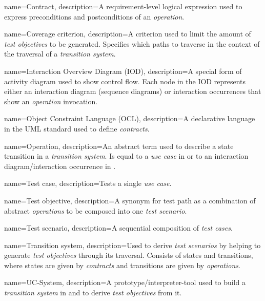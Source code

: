 {
	name={Contract},
	description={A requirement-level logical expression used to express preconditions and postconditions of an \textit{operation}.}
}

{
	name={Coverage criterion},
	description={A criterion used to limit the amount of \textit{test objectives} to be generated. Specifies which paths to traverse in the context of the traversal of a \textit{transition system}.}
}

{
	name={Interaction Overview Diagram (IOD)},
	description={A special form of activity diagram used to show control flow. Each node in the IOD represents either an interaction diagram (sequence diagrams) or interaction occurrences that show an \textit{operation} invocation.}
}

{
	name={Object Constraint Language (OCL)},
	description={A declarative language in the UML standard used to define \textit{contracts}.}
}

{
	name={Operation},
	description={An abstract term used to describe a state transition in a \textit{transition system}. Is equal to a \textit{use case} in \cite{ClementineNebut2006} or to an interaction diagram/interaction occurrence in \cite{NajlaRaza2007}.}
}

{
	name={Test case},
	description={Tests a single \textit{use case}.}
}

{
	name={Test objective},
	description={A synonym for test path as a combination of abstract \textit{operations} to be composed into one \textit{test scenario}.}
}

{
	name={Test scenario},
	description={A sequential composition of \textit{test cases}.}
}

{
	name={Transition system},
	description={Used to derive \textit{test scenarios} by helping to generate \textit{test objectives} through its traversal. Consists of states and transitions, where states are given by \textit{contracts} and transitions are given by \textit{operations}.}
}

{
	name={UC-System},
	description={A prototype/interpreter-tool used to build a \textit{transition system} in \cite{ClementineNebut2006} and to derive \textit{test objectives} from it.}
}

